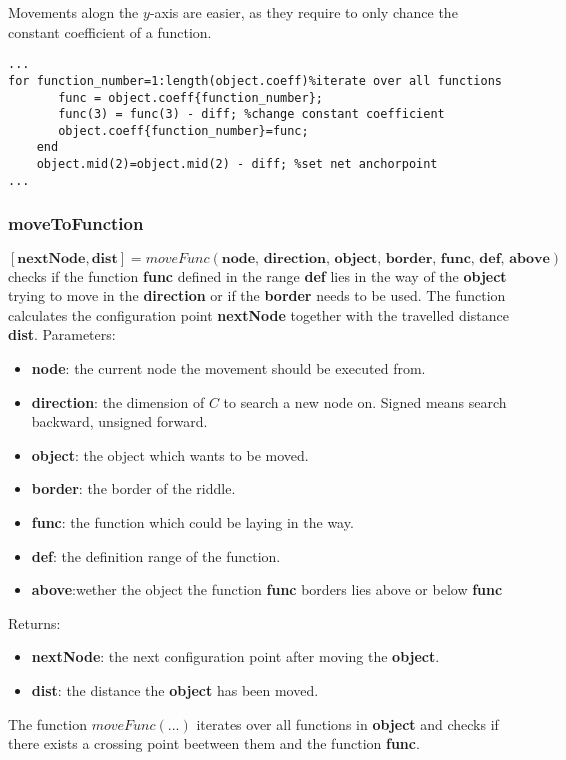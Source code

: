 Movements alogn the $y$-axis are easier, as they require to only chance the constant coefficient of a function. 
\begin{lstlisting}
...
for function_number=1:length(object.coeff)%iterate over all functions
       func = object.coeff{function_number};
       func(3) = func(3) - diff; %change constant coefficient
       object.coeff{function_number}=func;       
    end
    object.mid(2)=object.mid(2) - diff; %set net anchorpoint
...
\end{lstlisting}

\subsubsection{moveToFunction}
$[\textbf{nextNode},\textbf{dist}]=moveFunc(\textbf{node, direction, object, border, func, def, above})$ checks if the function \textbf{func} defined in the range \textbf{def} lies in the way of the \textbf{object} trying to move in the \textbf{direction} or if the \textbf{border} needs to be used. The function calculates the configuration point \textbf{nextNode} together with the travelled distance \textbf{dist}.
Parameters:
\begin{itemize}
\item \textbf{node}: the current node the movement should be executed from.
\item \textbf{direction}: the dimension of $C$ to search a new node on. Signed means search backward, unsigned forward. 
\item \textbf{object}: the object which wants to be moved.
\item \textbf{border}: the border of the riddle.
\item \textbf{func}: the function which could be laying in the way.
\item \textbf{def}: the definition range of the function.
\item \textbf{above}:wether the object the function \textbf{func} borders lies above or below \textbf{func}
\end{itemize}
Returns:
\begin{itemize}
\item \textbf{nextNode}: the next configuration point after moving the \textbf{object}.
\item \textbf{dist}: the distance the \textbf{object} has been moved.
\end{itemize}
The function $moveFunc(...)$ iterates over all functions in \textbf{object} and checks if there exists a crossing point beetween them and the function \textbf{func}.
